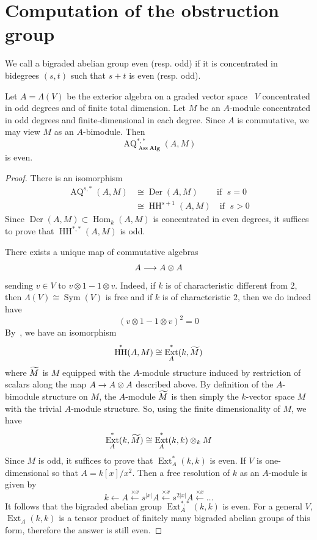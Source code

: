 \documentclass[AHL,Unicode,longabstracts,published]{cedram}
\DeclareMathOperator{\Ass}{Ass}
\DeclareMathOperator{\Ext}{Ext}
\DeclareMathOperator{\Hom}{Hom}
\DeclareMathOperator{\HH}{HH}
\DeclareMathOperator{\Der}{Der}
\DeclareMathOperator{\AQ}{AQ}
\DeclareMathOperator{\sym}{Sym}
\newcommand{\alg}{\mathbf{Alg}}
\renewcommand*{\to}{\mathchoice{\longrightarrow}{\rightarrow}{\rightarrow}{\rightarrow}}
\let\oldtilde\tilde
\renewcommand*{\tilde}[1]{\mathchoice{\widetilde{#1}}{\widetilde{#1}}{\oldtilde{#1}}{\oldtilde{#1}}}
\begin{document}
\section{Computation of the obstruction group}

\begin{defi}
We call a bigraded abelian group even (resp. odd) if it is concentrated in bidegrees $(s,t)$ such that $s+t$ is even (resp. odd).
\end{defi}


\begin{lemm}\label{lemm : Hochschild}
Let $A=\Lambda(V)$ be the exterior algebra on a graded vector space ~$V$ concentrated in odd degrees and of finite total dimension. Let $M$ be an $A$-module concentrated in odd degrees and finite-dimensional in each degree. Since $A$ is commutative, we may view $M$ as an $A$-bimodule. Then
\[
\AQ_{\Ass\alg}^{*,*}(A,M)
\]
is even.
\end{lemm}

\begin{proof}
There is an isomorphism
\begin{align*}
\AQ^{s,*}(A,M)&\cong \Der(A,M)\qquad\,\text{if }\;s=0\\
&\cong \HH^{s+1}(A,M)\quad\text{if }\;s>0
\end{align*}
Since $\Der(A,M)\subset \Hom_k(A,M)$ is concentrated in even degrees, it suffices to prove that $\HH^{*,*}(A,M)$ is odd.

There exists a unique map of commutative algebras
\[
A\to A\otimes A
\]
sending $v\in V$ to $v\otimes 1-1\otimes v$. Indeed, if $k$ is of characteristic different from $2$, then $\Lambda(V)\cong\sym(V)$ is free and if $k$ is of characteristic $2$, then we do indeed have
\[
(v\otimes 1-1\otimes v)^2=0
\]
By~\cite[Theorem~X.6.1]{cartaneilenberg}, we have an isomorphism
\[
\HH^*(A,M)\cong\Ext^*_A(k,\tilde{M})
\]
where $\tilde{M}$ is $M$ equipped with the $A$-module structure induced by restriction of scalars along the map $A\to A\otimes A$ described above. By definition of the $A$-bimodule structure on $M$, the $A$-module $\tilde{M}$ is then simply the $k$-vector space $M$ with the trivial $A$-module structure. So, using the finite dimensionality of $M$, we have
\[
\Ext_A^*(k,\tilde{M})\cong \Ext^*_A(k,k)\otimes_kM
\]
Since $M$ is odd, it suffices to prove that $\Ext^*_A(k,k)$ is even. If $V$ is one-dimensional so that $A=k[x]/x^2$. Then a free resolution of $k$ as an $A$-module is given by
\[
k\leftarrow{A}\xleftarrow{\times x} s^{|x|}A \xleftarrow{\times x}s^{2|x|}A\xleftarrow{\times x}\ldots
\]
It follows that the bigraded abelian group $\Ext^{*,*}_A(k,k)$ is even. For a general $V$, $\Ext_A(k,k)$ is a tensor product of finitely many bigraded abelian groups of this form, therefore the answer is still even.
\end{proof}
\end{document}
